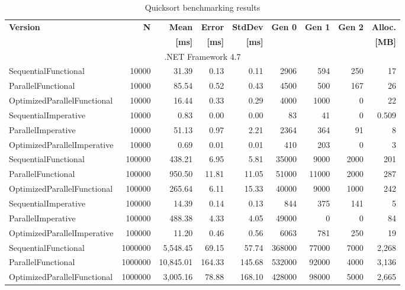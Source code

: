 \begin{table}\footnotesize
    \centering
    \caption{Quicksort benchmarking results}
		\label{tab: QuicksortBenchmarking}
    \begin{tabularx}{\linewidth}{Xrrrrrrrr} 
		  \toprule
			\toprule
			\bfseries Version 		&
			\bfseries N    	    	& 
			\bfseries Mean 	      &
			\bfseries Error       &
			\bfseries StdDev 	    &
			\bfseries Gen 0	    	&
			\bfseries Gen 1	    	&
			\bfseries Gen 2	    	&
			\bfseries Alloc.      \\ 
			&
			&
			\bfseries {[}ms{]} &
			\bfseries {[}ms{]} &
			\bfseries {[}ms{]} &
			&
			&
			&
			\bfseries{[}MB{]} \\			
			\midrule 
			\multicolumn{9}{c}{.NET Framework 4.7} \\ 
			\midrule 
SequentialFunctional	&	10000	&	31.39	&	0.13	&	0.11	&	2906	&	594	&	250	&	17	\\
ParallelFunctional	&	10000	&	85.54	&	0.52	&	0.43	&	4500	&	500	&	167	&	26	\\
OptimizedParallelFunctional	&	10000	&	16.44	&	0.33	&	0.29	&	4000	&	1000	&	0	&	22	\\
SequentialImperative	&	10000	&	0.83	&	0.00	&	0.00	&	83	&	41	&	0	&	0.509	\\
ParallelImperative	&	10000	&	51.13	&	0.97	&	2.21	&	2364	&	364	&	91	&	8	\\
OptimizedParallelImperative	&	10000	&	0.69	&	0.01	&	0.01	&	410	&	203	&	0	&	3	\\
SequentialFunctional	&	100000	&	438.21	&	6.95	&	5.81	&	35000	&	9000	&	2000	&	201	\\
ParallelFunctional	&	100000	&	950.50	&	11.81	&	11.05	&	51000	&	11000	&	2000	&	287	\\
OptimizedParallelFunctional	&	100000	&	265.64	&	6.11	&	15.33	&	40000	&	9000	&	1000	&	242	\\
SequentialImperative	&	100000	&	14.39	&	0.14	&	0.13	&	844	&	375	&	141	&	5	\\
ParallelImperative	&	100000	&	488.38	&	4.33	&	4.05	&	49000	&	0	&	0	&	84	\\
OptimizedParallelImperative	&	100000	&	11.20	&	0.46	&	0.56	&	6063	&	781	&	250	&	19	\\
SequentialFunctional	&	1000000	&	5,548.45	&	69.15	&	57.74	&	368000	&	77000	&	7000	&	2,268	\\
ParallelFunctional	&	1000000	&	10,845.01	&	164.33	&	145.68	&	532000	&	92000	&	4000	&	3,136	\\
OptimizedParallelFunctional	&	1000000	&	3,005.16	&	78.88	&	168.10	&	428000	&	98000	&	5000	&	2,665	\\

\end{tabularx}
\end{table}
